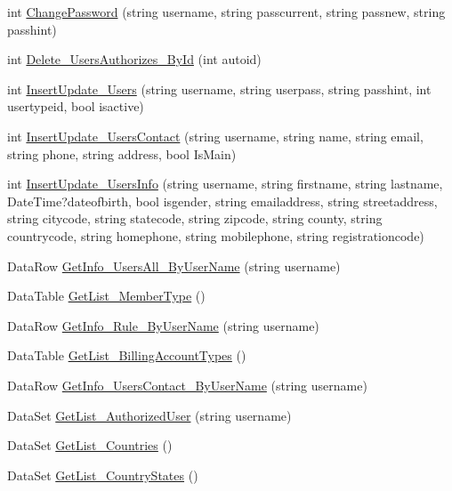 \begin{DoxyCompactItemize}
\item 
int \hyperlink{class_d_b_class_ad7007450fd0cc27c1659da147b0d00e1}{Change\-Password} (string username, string passcurrent, string passnew, string passhint)
\item 
int \hyperlink{class_d_b_class_a24d9d653a4be300dd6136af86afadd1b}{Delete\-\_\-\-Users\-Authorizes\-\_\-\-By\-Id} (int autoid)
\item 
int \hyperlink{class_d_b_class_a26cddcc85c3f1be4d246912113d3a231}{Insert\-Update\-\_\-\-Users} (string username, string userpass, string passhint, int usertypeid, bool isactive)
\item 
int \hyperlink{class_d_b_class_a8900e70ea5308637f732de925c2e217b}{Insert\-Update\-\_\-\-Users\-Contact} (string username, string name, string email, string phone, string address, bool Is\-Main)
\item 
int \hyperlink{class_d_b_class_a9254bd810d437740310edb4fc6b19623}{Insert\-Update\-\_\-\-Users\-Info} (string username, string firstname, string lastname, Date\-Time?dateofbirth, bool isgender, string emailaddress, string streetaddress, string citycode, string statecode, string zipcode, string county, string countrycode, string homephone, string mobilephone, string registrationcode)
\item 
Data\-Row \hyperlink{class_d_b_class_a968aacf4f03ce8b3d11fdfeb72bd7301}{Get\-Info\-\_\-\-Users\-All\-\_\-\-By\-User\-Name} (string username)
\item 
Data\-Table \hyperlink{class_d_b_class_a68c8c13196578b5e88d1f8b831c95088}{Get\-List\-\_\-\-Member\-Type} ()
\item 
Data\-Row \hyperlink{class_d_b_class_a0db4839a470f33aa8e982bebddaaa001}{Get\-Info\-\_\-\-Rule\-\_\-\-By\-User\-Name} (string username)
\item 
Data\-Table \hyperlink{class_d_b_class_af38a7f3159f4c030237c6dd91db26a9d}{Get\-List\-\_\-\-Billing\-Account\-Types} ()
\item 
Data\-Row \hyperlink{class_d_b_class_a954ef42cfdb46f0757f30f088a60da27}{Get\-Info\-\_\-\-Users\-Contact\-\_\-\-By\-User\-Name} (string username)
\item 
Data\-Set \hyperlink{class_d_b_class_a6b82464db643c0331528f6a2fa6e7c69}{Get\-List\-\_\-\-Authorized\-User} (string username)
\item 
Data\-Set \hyperlink{class_d_b_class_a8306b2abf31bf8c5762e10945dcc6b69}{Get\-List\-\_\-\-Countries} ()
\item 
Data\-Set \hyperlink{class_d_b_class_ac33ddf061999a06d82c2e50f435972cc}{Get\-List\-\_\-\-Country\-States} ()

\end{DoxyCompactItemize}

